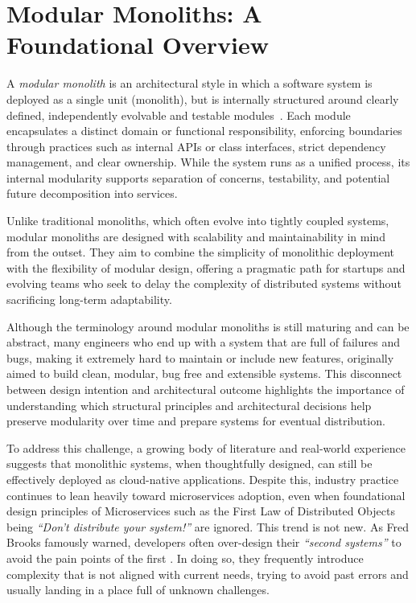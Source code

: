 \section{Modular Monoliths: A Foundational Overview}

A \textit{modular monolith} is an architectural style in which a software system is deployed as a single unit (monolith), but is internally structured around clearly defined, independently evolvable and testable modules~\cite{newman2019monolith}. Each module encapsulates a distinct domain or functional responsibility, enforcing boundaries through practices such as internal APIs or class interfaces, strict dependency management, and clear ownership. While the system runs as a unified process, its internal modularity supports separation of concerns, testability, and potential future decomposition into services.

Unlike traditional monoliths, which often evolve into tightly coupled systems, modular monoliths are designed with scalability and maintainability in mind from the outset. They aim to combine the simplicity of monolithic deployment with the flexibility of modular design, offering a pragmatic path for startups and evolving teams who seek to delay the complexity of distributed systems without sacrificing long-term adaptability.

Although the terminology around modular monoliths is still maturing and can be abstract, many engineers who end up with a system that are full of failures and bugs, making it extremely hard to maintain or include new features, originally aimed to build clean, modular, bug free and extensible systems. This disconnect between design intention and architectural outcome highlights the importance of understanding which structural principles and architectural decisions help preserve modularity over time and prepare systems for eventual distribution.


To address this challenge, a growing body of literature and real-world experience suggests that monolithic systems, when thoughtfully designed, can still be effectively deployed as cloud-native applications. Despite this, industry practice continues to lean heavily toward microservices adoption, even when foundational design principles of Microservices such as the First Law of Distributed Objects being \textit{“Don’t distribute your system!”} \cite{fowler2002patterns,newman2019monolith} are ignored. This trend is not new. As Fred Brooks famously warned, developers often over-design their \textit{“second systems”} to avoid the pain points of the first \cite{brooks1995}. In doing so, they frequently introduce complexity that is not aligned with current needs, trying to avoid past errors and usually landing in a place full of unknown challenges.


